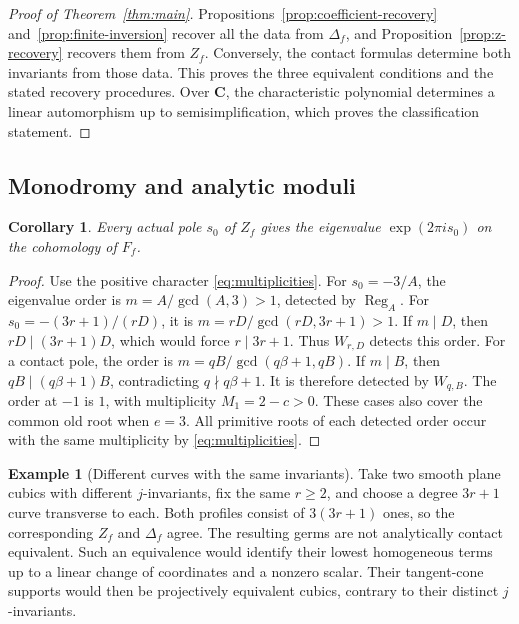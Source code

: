 \documentclass[11pt]{article}
\numberwithin{equation}{section}
\newtheorem{corollary}[theorem]{Corollary}
\theoremstyle{definition}
\newtheorem{example}[theorem]{Example}
\theoremstyle{remark}
\newcommand{\CC}{\mathbf C}
\newcommand{\Reg}{\operatorname{Reg}}
\begin{document}
\begin{proof}[Proof of Theorem~\ref{thm:main}]
Propositions~\ref{prop:coefficient-recovery}
and~\ref{prop:finite-inversion} recover all the data from
$\Delta_f$, and Proposition~\ref{prop:z-recovery} recovers them
from $Z_f$. Conversely, the contact formulas determine both
invariants from those data. This proves the three equivalent
conditions and the stated recovery procedures. Over $\CC$,
the characteristic polynomial determines a linear
automorphism up to semisimplification, which proves the
classification statement.
\end{proof}

\subsection{Monodromy and analytic moduli}

\begin{corollary}\label{cor:monodromy}
Every actual pole $s_0$ of $Z_f$ gives the eigenvalue
$\exp(2\pi i s_0)$ on the cohomology of $F_f$.
\end{corollary}

\begin{proof}
Use the positive character \eqref{eq:multiplicities}.
For $s_0=-3/A$, the eigenvalue order is
$m=A/\gcd(A,3)>1$, detected by $\Reg_A$.
For $s_0=-(3r+1)/(rD)$, it is
$m=rD/\gcd(rD,3r+1)>1$. If $m\mid D$, then
$rD\mid(3r+1)D$, which would force $r\mid3r+1$.
Thus $W_{r,D}$ detects this order.
For a contact pole, the order is
$m=qB/\gcd(q\beta+1,qB)$. If $m\mid B$, then
$qB\mid(q\beta+1)B$, contradicting $q\nmid q\beta+1$.
It is therefore detected by $W_{q,B}$.
The order at $-1$ is $1$, with multiplicity $M_1=2-c>0$.
These cases also cover the common old root when $e=3$.
All primitive roots of each detected order occur with the
same multiplicity by \eqref{eq:multiplicities}.
\end{proof}

\begin{example}[Different curves with the same invariants]
\label{ex:cubic-moduli}
Take two smooth plane cubics with different $j$-invariants,
fix the same $r\ge2$, and choose a degree $3r+1$ curve transverse
to each. Both profiles consist of $3(3r+1)$ ones, so the
corresponding $Z_f$ and $\Delta_f$ agree.
The resulting germs are not analytically contact equivalent.
Such an equivalence would identify their lowest homogeneous
terms up to a linear change of coordinates and a nonzero
scalar. Their tangent-cone supports would then be projectively
equivalent cubics, contrary to their distinct $j$-invariants.
\end{example}
\end{document}

